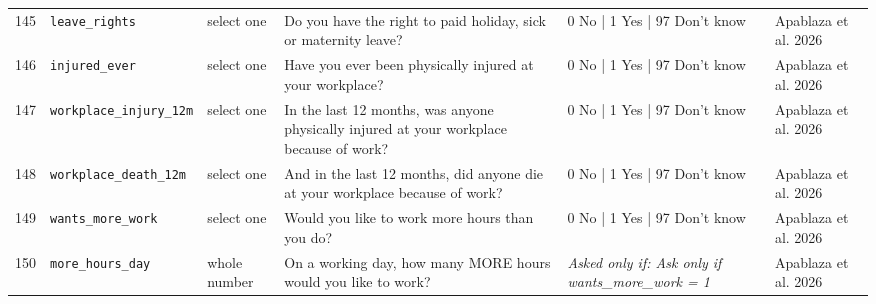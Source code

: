 \documentclass[9pt,a4paper,landscape]{article}
\begin{document}
\begin{longtable}{@{}p{0.5cm}p{3.3cm}p{1.7cm}p{7.3cm}p{5.6cm}p{5.4cm}@{}}
\footnotesize 145 & \footnotesize\texttt{leave\_rights} & \scriptsize select one & \footnotesize Do you have the right to paid holiday, sick or maternity leave?\par\vspace{1pt}{\footnotesize\color{hdr}{\hifont क्या आपको पैसे वाली छुट्टी मिलती है — त्योहार, बीमारी या ज़च्चगी की?}} & \scriptsize 0 No | 1 Yes | 97 Don't know & \scriptsize Apablaza et al. 2026\\
\footnotesize 146 & \footnotesize\texttt{injured\_ever} & \scriptsize select one & \footnotesize Have you ever been physically injured at your workplace?\par\vspace{1pt}{\footnotesize\color{hdr}{\hifont क्या आपको कभी काम की जगह पर चोट लगी है?}} & \scriptsize 0 No | 1 Yes | 97 Don't know & \scriptsize Apablaza et al. 2026\\
\footnotesize 147 & \footnotesize\texttt{workplace\_injury\_12m} & \scriptsize select one & \footnotesize In the last 12 months, was anyone physically injured at your workplace because of work?\par\vspace{1pt}{\footnotesize\color{hdr}{\hifont पिछले 12 महीनों में क्या आपके काम की जगह पर काम की वजह से किसी को चोट लगी?}} & \scriptsize 0 No | 1 Yes | 97 Don't know & \scriptsize Apablaza et al. 2026\\
\footnotesize 148 & \footnotesize\texttt{workplace\_death\_12m} & \scriptsize select one & \footnotesize And in the last 12 months, did anyone die at your workplace because of work?\par\vspace{1pt}{\footnotesize\color{hdr}{\hifont और पिछले 12 महीनों में, क्या आपके काम की जगह पर काम की वजह से किसी की मौत हुई?}} & \scriptsize 0 No | 1 Yes | 97 Don't know & \scriptsize Apablaza et al. 2026\\
\footnotesize 149 & \footnotesize\texttt{wants\_more\_work} & \scriptsize select one & \footnotesize Would you like to work more hours than you do?\par\vspace{1pt}{\footnotesize\color{hdr}{\hifont क्या आप अभी से ज़्यादा घंटे काम करना चाहेंगे?}} & \scriptsize 0 No | 1 Yes | 97 Don't know & \scriptsize Apablaza et al. 2026\\
\footnotesize 150 & \footnotesize\texttt{more\_hours\_day} & \scriptsize whole number & \footnotesize On a working day, how many MORE hours would you like to work?\par\vspace{1pt}{\footnotesize\color{hdr}{\hifont काम के दिन में आप कितने घंटे और काम करना चाहेंगे?}} & \scriptsize \textit{Asked only if: Ask only if wants\_more\_work = 1} & \scriptsize Apablaza et al. 2026\\

\end{longtable}
\end{document}
